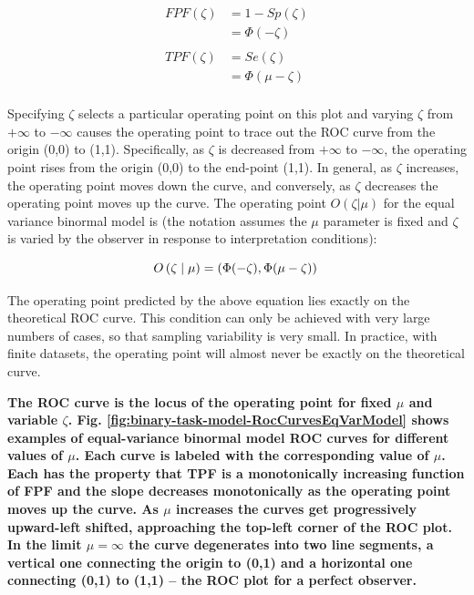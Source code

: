 \documentclass[
]{book}
\begin{document}
\begin{equation} 
\begin{aligned} 
FPF\left ( \zeta \right ) &= 1 - Sp\left ( \zeta \right ) \\
&=\Phi\left ( -\zeta \right )\\
\\
TPF\left ( \zeta \right ) &= Se\left ( \zeta \right ) \\
&=\Phi\left (\mu -\zeta \right )\\ 
\end{aligned} 
\label{eq:binary-task-model-op-pt}
\end{equation}

Specifying \(\zeta\) selects a particular operating point on this plot and varying \(\zeta\) from \(+\infty\) to \(-\infty\) causes the operating point to trace out the ROC curve from the origin (0,0) to (1,1). Specifically, as \(\zeta\) is decreased from \(+\infty\) to \(-\infty\), the operating point rises from the origin (0,0) to the end-point (1,1). In general, as \(\zeta\) increases, the operating point moves down the curve, and conversely, as \(\zeta\) decreases the operating point moves up the curve. The operating point \(O(\zeta|\mu)\) for the equal variance binormal model is (the notation assumes the \(\mu\) parameter is fixed and \(\zeta\) is varied by the observer in response to interpretation conditions):

\begin{equation} 
O\left ( \zeta \mid \mu \right ) = \left ( \Phi(-\zeta), \Phi(\mu-\zeta) \right ) \\
\label{eq:binary-task-model-OpPt}
\end{equation}

The operating point predicted by the above equation lies exactly on the theoretical ROC curve. This condition can only be achieved with very large numbers of cases, so that sampling variability is very small. In practice, with finite datasets, the operating point will almost never be exactly on the theoretical curve.

\textbf{The ROC curve is the locus of the operating point for fixed \(\mu\) and variable \(\zeta\). Fig. \ref{fig:binary-task-model-RocCurvesEqVarModel} shows examples of equal-variance binormal model ROC curves for different values of \(\mu\). Each curve is labeled with the corresponding value of \(\mu\). Each has the property that TPF is a monotonically increasing function of FPF and the slope decreases monotonically as the operating point moves up the curve. As \(\mu\) increases the curves get progressively upward-left shifted, approaching the top-left corner of the ROC plot. In the limit \(\mu = \infty\) the curve degenerates into two line segments, a vertical one connecting the origin to (0,1) and a horizontal one connecting (0,1) to (1,1) -- the ROC plot for a perfect observer.}
\end{document}
